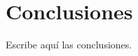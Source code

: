 \documentclass[../main.tex]{subfiles}
\begin{document}
\chapter{Conclusiones}

Escribe aquí las conclusiones.
\end{document}

